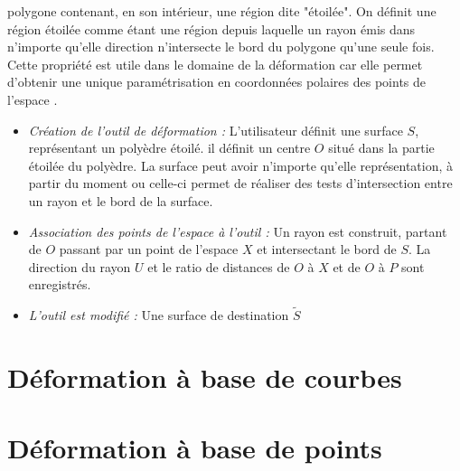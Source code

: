\begin{itemize}
  polygone contenant, en son intérieur, une région dite "étoilée". On
  définit une région étoilée comme étant une région depuis laquelle un
  rayon émis dans n'importe qu'elle direction n'intersecte le bord du
  polygone qu'une seule fois. Cette propriété est utile dans le
  domaine de la déformation car elle permet d'obtenir une unique
  paramétrisation en coordonnées polaires des points de l'espace \cite{JL00}.
  \begin{itemize}
  \item{\textit{Création de l'outil de déformation :}} L'utilisateur
    définit une surface \( S \), représentant un polyèdre étoilé. il
    définit un centre \( O \) situé dans la partie étoilée du
    polyèdre. La surface peut avoir n'importe qu'elle représentation,
    à partir du moment ou celle-ci permet de réaliser des tests
    d'intersection entre un rayon et le bord de la surface.
  \item{\textit{Association des points de l'espace à l'outil :}} Un
    rayon est construit, partant de \( O \) passant par un point de
    l'espace \( X \) et intersectant le bord de \( S \). La direction
    du rayon \( U \) et le ratio de distances de \( O \) à \( X \) et
    de \( O \) à \( P \) sont enregistrés.
  \item{\textit{L'outil est modifié :}} Une surface de destination \(
    \tilde{S} \)
  \end{itemize}
\end{itemize}

\section{Déformation à base de courbes}

\section{Déformation à base de points}


